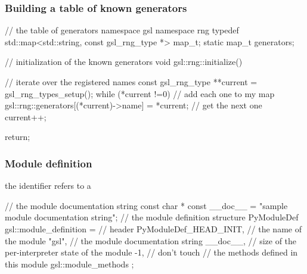 \begin{frame}[fragile]
%
  \frametitle{Building a table of known generators}
%
  \begin{iC++}
// the table of generators
namespace gsl {
    namespace rng {
        typedef std::map<std::string, const gsl_rng_type *> map_t;
        static map_t generators;
    }
}

// initialization of the known generators
void 
gsl::rng::initialize()
{
    // iterate over the registered names
    const gsl_rng_type **current = gsl_rng_types_setup();
    while (*current !=0) {
        // add each one to my map
        gsl::rng::generators[(*current)->name] = *current;
        // get the next one
        current++;
    }

    return;
}
  \end{iC++}
%
\end{frame}

\begin{frame}[fragile]
%
  \frametitle{Module definition}
%
  the identifier  refers to a 
  \begin{iC++}{}
// the module documentation string
const char * const __doc__ = "sample module documentation string";
// the module definition structure
PyModuleDef gsl::module_definition = {
    // header
    PyModuleDef_HEAD_INIT,
    // the name of the module
    "gsl",
    // the module documentation string
    __doc__,
    // size of the per-interpreter state of the module
    -1, // don't touch
    // the methods defined in this module
    gsl::module_methods
};
  \end{iC++}
%
\end{frame}

